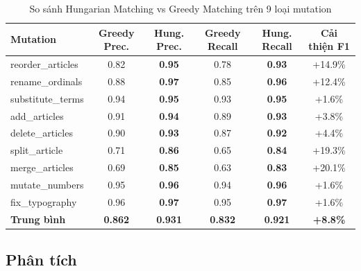 \begin{table}[H]
    \centering
    \caption{So sánh Hungarian Matching vs Greedy Matching trên 9 loại mutation}
    \label{tab:alignment_comparison}
    \begin{tabularx}{\textwidth}{X @{\hskip 6pt} c @{\hskip 6pt} c @{\hskip 6pt} c @{\hskip 6pt} c @{\hskip 6pt} c}
        \toprule
        \textbf{Mutation} & \textbf{Greedy Prec.} & \textbf{Hung. Prec.} & \textbf{Greedy Recall} & \textbf{Hung. Recall} & \textbf{Cải thiện F1}\\
        \midrule
        reorder\_articles & 0.82 & \textbf{0.95} & 0.78 & \textbf{0.93} & +14.9\%\\
        rename\_ordinals & 0.88 & \textbf{0.97} & 0.85 & \textbf{0.96} & +12.4\%\\
        substitute\_terms & 0.94 & \textbf{0.95} & 0.93 & \textbf{0.95} & +1.6\%\\
        add\_articles & 0.91 & \textbf{0.94} & 0.89 & \textbf{0.93} & +3.8\%\\
        delete\_articles & 0.90 & \textbf{0.93} & 0.87 & \textbf{0.92} & +4.4\%\\
        split\_article & 0.71 & \textbf{0.86} & 0.65 & \textbf{0.84} & +19.3\%\\
        merge\_articles & 0.69 & \textbf{0.85} & 0.63 & \textbf{0.83} & +20.1\%\\
        mutate\_numbers & 0.95 & \textbf{0.96} & 0.94 & \textbf{0.96} & +1.6\%\\
        fix\_typography & 0.96 & \textbf{0.97} & 0.95 & \textbf{0.97} & +1.6\%\\
        \midrule
        \textbf{Trung bình} & \textbf{0.862} & \textbf{0.931} & \textbf{0.832} & \textbf{0.921} & \textbf{+8.8\%}\\
        \bottomrule
    \end{tabularx}
\end{table}

\subsection{Phân tích}

